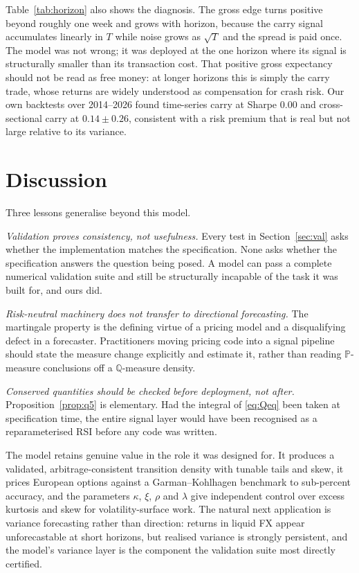 \documentclass[11pt]{article}
\begin{document}
Table~\ref{tab:horizon} also shows the diagnosis. The gross edge turns
positive beyond roughly one week and grows with horizon, because the carry
signal accumulates linearly in $T$ while noise grows as $\sqrt{T}$ and the
spread is paid once. The model was not wrong; it was deployed at the one
horizon where its signal is structurally smaller than its transaction cost.
That positive gross expectancy should not be read as free money: at longer
horizons this is simply the carry trade, whose returns are widely understood
as compensation for crash risk. Our own backtests over 2014--2026 found
time-series carry at Sharpe $0.00$ and cross-sectional carry at
$0.14 \pm 0.26$, consistent with a risk premium that is real but not large
relative to its variance.

\section{Discussion}

Three lessons generalise beyond this model.

\emph{Validation proves consistency, not usefulness.} Every test in
Section~\ref{sec:val} asks whether the implementation matches the
specification. None asks whether the specification answers the question
being posed. A model can pass a complete numerical validation suite and
still be structurally incapable of the task it was built for, and ours did.

\emph{Risk-neutral machinery does not transfer to directional forecasting.}
The martingale property is the defining virtue of a pricing model and a
disqualifying defect in a forecaster. Practitioners moving pricing code into
a signal pipeline should state the measure change explicitly and estimate
it, rather than reading $\mathbb{P}$-measure conclusions off a
$\mathbb{Q}$-measure density.

\emph{Conserved quantities should be checked before deployment, not after.}
Proposition~\ref{prop:q5} is elementary. Had the integral of \eqref{eq:Qeq}
been taken at specification time, the entire signal layer would have been
recognised as a reparameterised RSI before any code was written.

The model retains genuine value in the role it was designed for. It produces
a validated, arbitrage-consistent transition density with tunable tails and
skew, it prices European options against a Garman--Kohlhagen benchmark to
sub-percent accuracy, and the parameters $\kappa$, $\xi$, $\rho$ and
$\lambda$ give independent control over excess kurtosis and skew for
volatility-surface work. The natural next application is variance
forecasting rather than direction: returns in liquid FX appear
unforecastable at short horizons, but realised variance is strongly
persistent, and the model's variance layer is the component the validation
suite most directly certified.
\end{document}
